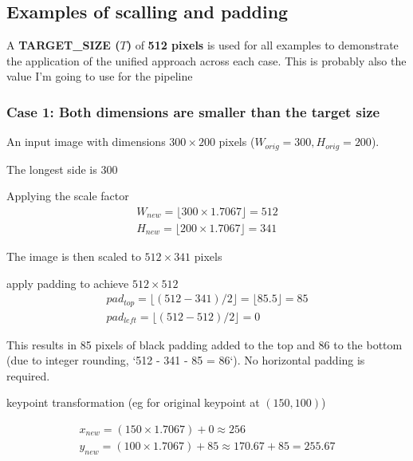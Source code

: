 \subsection{Examples of scalling and padding}

A \textbf{TARGET\_SIZE ($T$)} of \textbf{512 pixels} is used for all examples to
demonstrate the application of the unified approach across each case. This is probably
also the value I'm going to use for the pipeline

\subsubsection{Case 1: Both dimensions are smaller than the target size}

An input image with dimensions $300 \times 200$ pixels ($W_{orig}=300, H_{orig}=200$).

\begin{compactitem}
	\item The longest side is 300
	\item Applying the scale factor
	\begin{equation}
		\label{eq:case_1_scale}
		\begin{aligned}
			W_{new} = \lfloor 300 \times 1.7067 \rfloor = 512 \\
			H_{new} = \lfloor 200 \times 1.7067 \rfloor = 341
		\end{aligned}
	\end{equation}
	\item The image is then scaled to $512 \times 341$ pixels
	\item apply padding to achieve $512 \times 512$
	\begin{equation}
		\label{eq:case_1_padding}
		\begin{aligned}
			pad_{top} = \lfloor (512 - 341) / 2 \rfloor = \lfloor 85.5 \rfloor = 85 \\
			pad_{left} = \lfloor (512 - 512) / 2 \rfloor = 0
		\end{aligned}
	\end{equation}

	\item This results in 85 pixels of black padding added to the top and 86 to the
	bottom (due to integer rounding, `512 - 341 - 85 = 86`). No horizontal padding
	is required.
	\item keypoint transformation (eg for original keypoint at $(150,100)$)

	\begin{equation}
		\label{eq:case_1_keypoint_transformation}
		\begin{aligned}
			x_{new} = (150 \times 1.7067) + 0 \approx 256 \\
			y_{new} = (100 \times 1.7067) + 85 \approx 170.67 + 85 = 255.67
		\end{aligned}
	\end{equation}
\end{compactitem}

